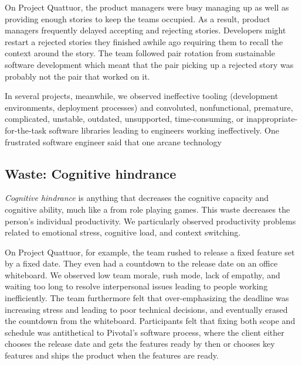 On Project Quattuor, the product managers were busy managing up as well as providing enough stories to keep the teams occupied. As a result, product managers frequently delayed accepting and rejecting stories. Developers might restart a rejected stories they finished awhile ago requiring them to recall the context around the story. The team followed pair rotation from sustainable software development \cite{SedanoSustainableSoftware} which meant that the pair picking up a rejected story was probably not the pair that worked on it.

In several projects, meanwhile, we observed ineffective tooling (development environments, deployment processes) and convoluted, nonfunctional, premature, complicated, unstable, outdated, unsupported, time-consuming, or inappropriate-for-the-task software libraries leading to engineers working ineffectively. One frustrated software engineer said that one arcane technology 
\subsection{Waste: Cognitive hindrance}
\textit{Cognitive hindrance} is anything that decreases the cognitive capacity and cognitive ability, much like a  from role playing games. This waste decreases the person's individual productivity. We particularly observed productivity problems related to emotional stress, cognitive load, and context switching.

On Project Quattuor, for example, the team rushed to release a fixed feature set by a fixed date. They even had a countdown to the release date on an office whiteboard. We observed low team morale, rush mode, lack of empathy, and waiting too long to resolve interpersonal issues leading to people working inefficiently. The team furthermore felt that over-emphasizing the deadline was increasing stress and leading to poor technical decisions, and eventually erased the countdown from the whiteboard. Participants felt that fixing both scope and schedule was antithetical to Pivotal's software process, where the client either chooses the release date and gets the features ready by then or chooses key features and ships the product when the features are ready. 
